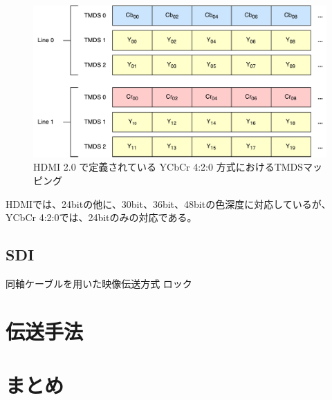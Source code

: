 \begin{figure}[htbp]
    \begin{center}
        \includegraphics[bb=0 0 591 306,width=15.5cm]{img/hdmi-spec-yuv-420.pdf}
    \end{center}
    \caption{HDMI 2.0 で定義されている YCbCr 4:2:0 方式におけるTMDSマッピング}
    \label{fig:hdmi-spec-yuv-420}
\end{figure}

HDMIでは、24bitの他に、30bit、36bit、48bitの色深度に対応しているが、YCbCr 4:2:0では、24bitのみの対応である。

\subsection{SDI}

同軸ケーブルを用いた映像伝送方式
ロック

\section{伝送手法}

\section{まとめ}
